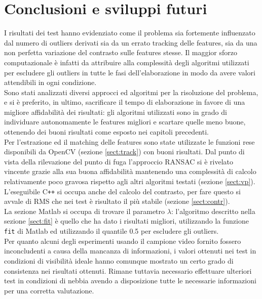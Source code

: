 \documentclass[12pt]{report}
\begin{document}
\chapter{Conclusioni e sviluppi futuri}

\noindent I risultati dei test hanno evidenziato come il problema sia fortemente influenzato dal numero di outliers derivati sia da un errato tracking delle features, sia da una non perfetta variazione del contrasto sulle features stesse. Il maggior sforzo computazionale \`e infatti da attribuire alla complessit\`a degli algoritmi utilizzati per escludere gli outliers in tutte le fasi dell'elaborazione in modo da avere valori attendibili in ogni condizione.\\

\noindent Sono stati analizzati diversi approcci ed algoritmi per la risoluzione del problema, e si \`e preferito, in ultimo, sacrificare il tempo di elaborazione in favore di una migliore affidabilit\`a dei risultati: gli algoritmi utilizzati sono in grado di individuare autonomamente le features migliori e scartare quelle meno buone, ottenendo dei buoni risultati come esposto nei capitoli precedenti.\\

\noindent Per l'estrazione ed il matching delle features sono state utilizzate le funzioni rese disponibili da OpenCV (sezione \ref{sect:track}) con buoni risultati. Dal punto di vista della rilevazione del punto di fuga l'approccio RANSAC si \`e rivelato vincente grazie alla sua buona affidabilit\`a mantenendo una complessit\`a di calcolo relativamente poco gravosa rispetto agli altri algoritmi testati (sezione \ref{sect:vp}). L'eseguibile C\verb|++| si occupa anche del calcolo del contrasto, per fare questo si avvale di RMS che nei test \`e risultato il pi\`u stabile (sezione \ref{sect:contr}). \\

\noindent La sezione Matlab si occupa di trovare il parametro $\lambda$: l'algoritmo descritto nella sezione \ref{sect:fit} \`e quello che ha dato i risultati migliori, utilizzando la funzione \verb|fit| di Matlab ed utilizzando il quantile 0.5 per escludere gli outliers.\\

\noindent Per quanto alcuni degli esperimenti usando il campione video fornito fossero inconcludenti a causa della mancanza di informazioni, i valori ottenuti nei test in condizioni di visibilit\`a ideale hanno comunque mostrato un certo grado di consistenza nei risultati ottenuti. Rimane tuttavia necessario effettuare ulteriori test in condizioni di nebbia avendo a disposizione tutte le necessarie informazioni per una corretta valutazione.\\
\end{document}
